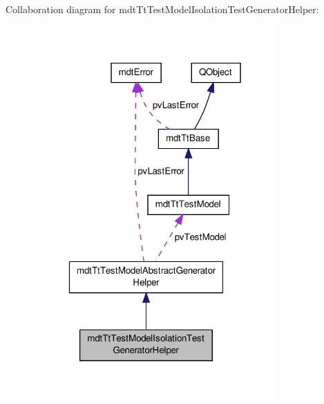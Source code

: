 Collaboration diagram for mdt\-Tt\-Test\-Model\-Isolation\-Test\-Generator\-Helper\-:
\nopagebreak
\begin{figure}[H]
\begin{center}
\leavevmode
\includegraphics[width=265pt]{classmdt_tt_test_model_isolation_test_generator_helper__coll__graph}
\end{center}
\end{figure}
